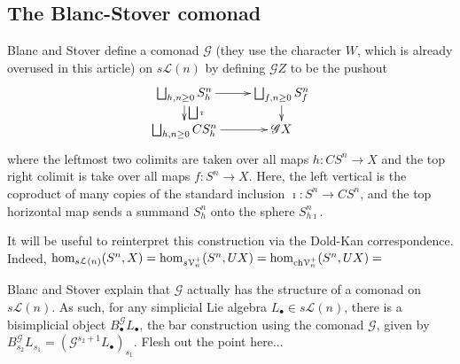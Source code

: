 \documentclass[11pt]{amsart}
\theoremstyle{plain}
\theoremstyle{definition}
\renewcommand{\to}{\longrightarrow}
\newcommand{\scrQ}{\mathscr{Q}}
\newcommand{\scrR}{\mathscr{R}}
\newcommand{\scrT}{\mathscr{T}}
\newcommand{\scrY}{\mathscr{Y}}
\newcommand{\scrI}{\mathscr{I}}
\newcommand{\scrO}{\mathscr{O}}
\newcommand{\scrP}{\mathscr{P}}
\newcommand{\scrS}{\mathscr{S}}
\newcommand{\scrG}{\mathscr{G}}
\newcommand{\scrH}{\mathscr{H}}
\newcommand{\scrJ}{\mathscr{J}}
\newcommand{\scrK}{\mathscr{K}}
\newcommand{\scrL}{\mathscr{L}}
\newcommand{\scrZ}{\mathscr{Z}}
\newcommand{\scrN}{\mathscr{N}}
\newcommand{\scrM}{\mathscr{M}}
\newcommand{\calL}{\mathcal{L}}
\newcommand{\calV}{\mathcal{V}}
\theoremstyle{plain}
\newcommand{\vect}[2]{\calV^{#1}_{#2}}
\newcommand{\BSW}{{\scrG}}%
\begin{document}
\begin{comp func sseq old version}
\subsection{The Blanc-Stover comonad}
Blanc and Stover \cite{Blanc_Stover-Groth_SS.pdf} define a comonad $\BSW$ (they use the character $W$, which is already overused in this article) on $s\calL(n)$ by defining $\BSW Z$ to be the pushout
\[\xymatrix@R=4mm{
\bigsqcup_{h,n\geq0}S^n_h
\ar[r]\ar[d]^-{\bigsqcup\imath}
&%
\bigsqcup_{f,n\geq0}S^n_f\ar[d]\\%
\bigsqcup_{h,n\geq0}CS^n_h
\ar[r]&%
\BSW X%
}\]
where the leftmost two colimits are taken over all maps $h:CS^n\to X$ and the top right colimit is take over all maps $f:S^n\to X$.
Here, the left vertical is the coproduct of many copies of the standard inclusion $\imath:S^n\to CS^n$, and the top horizontal map sends a summand $S^n_h$ onto the sphere $S^n_{h\imath}$.

It will be useful to reinterpret this construction via the Dold-Kan correspondence. Indeed, $\hom_{s\calL(n)}(S^n,X)=\hom_{s\vect{+}{n}}(S^n,UX)=\hom_{\textup{ch}\vect{+}{n}}(S^n,UX)=$

Blanc and Stover explain that $\BSW $ actually has the structure of a comonad on $s\calL(n)$. As such, for any simplicial Lie algebra $L_\bullet\in s\calL(n)$, there is a bisimplicial object $B_\bullet^\BSW L_\bullet$, the bar construction using the comonad $\BSW $, given by $B_{s_2}^\BSW L_{s_1}=(\BSW^{s_2+1}L_\bullet)_{s_1}$. Flesh out the point here...


\end{comp func sseq old version}
\end{document}
